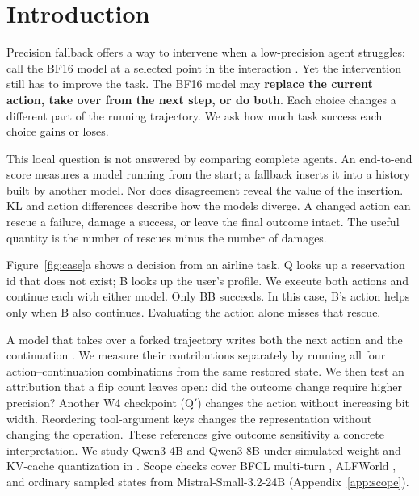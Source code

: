\section{Introduction}
\label{sec:intro}

Precision fallback offers a way to intervene when a low-precision agent struggles: call the BF16 model at a selected point in the interaction \citep{li2026dynamicmp}. Yet the intervention still has to improve the task. The BF16 model may \textbf{replace the current action, take over from the next step, or do both}. Each choice changes a different part of the running trajectory. We ask how much task success each choice gains or loses.

This local question is not answered by comparing complete agents. An end-to-end score measures a model running from the start; a fallback inserts it into a history built by another model. Nor does disagreement reveal the value of the insertion. KL and action differences describe how the models diverge. A changed action can rescue a failure, damage a success, or leave the final outcome intact. The useful quantity is the number of rescues minus the number of damages.


Figure~\ref{fig:case}a shows a decision from an airline task. Q looks up a reservation id that does not exist; B looks up the user's profile. We execute both actions and continue each with either model. Only BB succeeds. In this case, B's action helps only when B also continues. Evaluating the action alone misses that rescue. %

A model that takes over a forked trajectory writes both the next action and the continuation \citep{gonuguntla2026replay}. We measure their contributions separately by running all four action--continuation combinations from the same restored state. We then test an attribution that a flip count leaves open: did the outcome change require higher precision? Another W4 checkpoint (Q$'$) changes the action without increasing bit width. Reordering tool-argument keys changes the representation without changing the operation. These references give outcome sensitivity a concrete interpretation. We study Qwen3-4B and Qwen3-8B \citep{yang2025qwen3} under simulated weight and KV-cache quantization in \tautwo{} \citep{yao2024tau,barres2025tau2}. Scope checks cover BFCL multi-turn \citep{patil2025bfcl}, ALFWorld \citep{shridhar2021alfworld}, and ordinary sampled states from Mistral-Small-3.2-24B \citep{mistral2025small32} (Appendix~\ref{app:scope}). %

